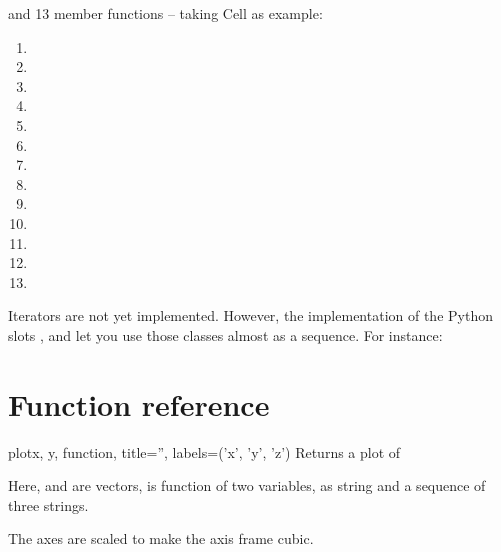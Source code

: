 \documentclass{manual}
\newcommand{\Future}{
  \begin{notice}[warning]
    The documentation is for the future PyQwt3D-0.1.6 which has not yet been
    released.  Please refer, to the documentation in the release that you are
    using.
  \end{notice}
}
\renewcommand{\Future}{}
\begin{document}
and 13 member functions -- taking Cell as example:
\begin{enumerate}
\item
\item
\item
\item
\item
\item
\item
\item
\item
\item
\item
\item
\item
\end{enumerate}

Iterators are not yet implemented. However, the implementation of the
Python slots ,  and
 let you use those classes almost as a sequence.
For instance:



\section{Function reference \label{functions}}

\Future{}

\begin{funcdesc}{plot}{x, y, function, title='', labels=('x', 'y', 'z')}
  Returns a plot of 
  
  Here,  and  are vectors,  is function of two
  variables,  as string and  a sequence of three strings.

  The axes are scaled to make the axis frame cubic.
\end{funcdesc}
\end{document}
